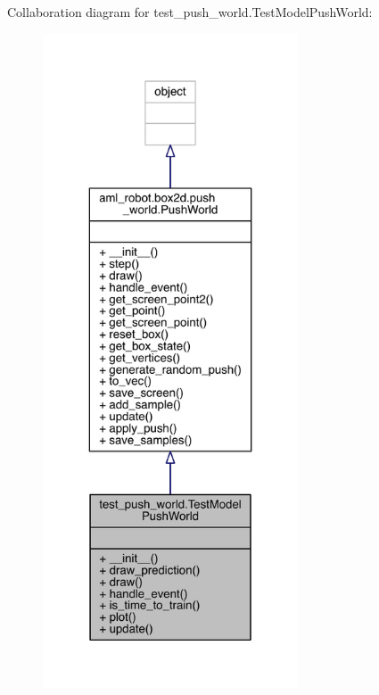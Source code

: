 Collaboration diagram for test\+\_\+push\+\_\+world.\+Test\+Model\+Push\+World\+:\nopagebreak
\begin{figure}[H]
\begin{center}
\leavevmode
\includegraphics[height=550pt]{classtest__push__world_1_1_test_model_push_world__coll__graph}
\end{center}
\end{figure}
